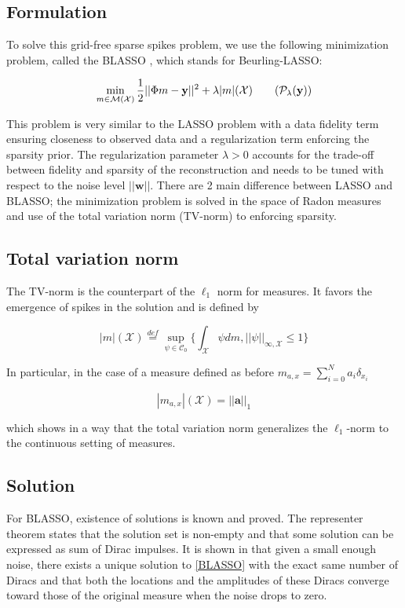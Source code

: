 \documentclass[a4paper,12pt,oneside]{report}
\theoremstyle{named}
\begin{document}
\subsection{Formulation}
To solve this grid-free sparse spikes problem, we use the following minimization problem, called the BLASSO \cite{Castro2012}, which stands for Beurling-LASSO:

\begin{equation}
    \min_{m \in \mathcal{M}(\mathcal{X})}  \frac{1}{2} ||\Phi m - \mathbf{y}||^2 + \lambda |m|(\mathcal{X})
    \tag{$\mathcal{P}_\lambda (\mathbf{y})$}
    \label{BLASSO}
\end{equation}

This problem is very similar to the LASSO problem with a data fidelity term ensuring closeness to observed data and a regularization term enforcing the sparsity prior. The regularization parameter $\lambda > 0$ accounts for the trade-off between fidelity and sparsity of the reconstruction and needs to be tuned with respect to the noise level $||\mathbf{w}||$. There are 2 main difference between LASSO and BLASSO; the minimization problem is solved in the space of Radon measures and use of the total variation norm (TV-norm) to enforcing sparsity.

\subsection{Total variation norm}
The TV-norm is the counterpart of the $\ell_1$ norm for measures. It favors the emergence of spikes in the solution and is defined by

\begin{equation}
    |m|(\mathcal{X}) \stackrel{def}{=} \sup_{\psi \in \mathcal{C}_0} \biggl\{ \int_{\mathcal{X}} \psi dm, ||\psi||_{\infty, \mathcal{X}} \leq 1 \biggl\}
\end{equation}

In particular, in the case of a measure defined as before $m_{a, x} = \sum_{i = 0}^{N} a_i \delta_{x_i}$

\begin{equation*}
    |m_{a, x}|(\mathcal{X}) = ||\mathbf{a}||_1
\end{equation*}

which shows in a way that the total variation norm generalizes the $\ell_1$-norm to the continuous setting of measures.

\subsection{Solution}
For BLASSO, existence of solutions is known and proved. The representer theorem states that the solution set is non-empty and that some solution can be expressed as sum of Dirac impulses. It is shown in \cite{Duval2014} that given a small enough noise, there exists a unique solution to \eqref{BLASSO} with the exact same number of Diracs and that both the locations and the amplitudes of these Diracs converge toward those of the original measure when the noise drops to zero.
\end{document}
